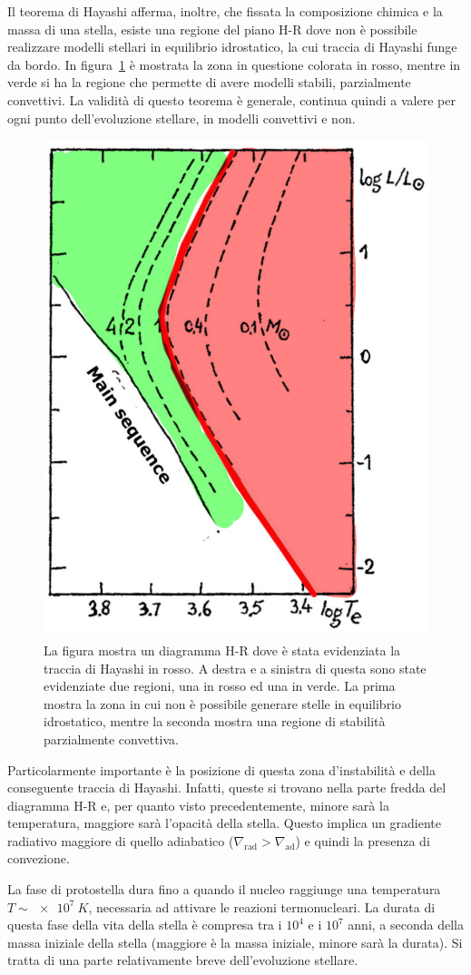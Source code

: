 Il teorema di Hayashi afferma, inoltre, che fissata la composizione chimica e la massa di una stella, esiste una regione del piano H-R dove non è possibile realizzare modelli stellari in equilibrio idrostatico, la cui traccia di Hayashi funge da bordo. In figura~\ref{fig:hay} è mostrata la zona in questione colorata in rosso, mentre in verde si ha la regione che permette di avere modelli stabili, parzialmente convettivi. La validità di questo teorema è generale,  continua quindi a valere per ogni punto dell'evoluzione stellare, in modelli convettivi e non.

\begin{figure}
    \centering
    \includegraphics[width = 0.3 \textwidth]{immagini/hayashi-1.png}
    \caption{La figura mostra un diagramma H-R dove è stata evidenziata la traccia di Hayashi in rosso. A destra e a sinistra di questa sono state evidenziate due regioni, una in rosso ed una in verde. La prima mostra la zona in cui non è possibile generare stelle in equilibrio idrostatico, mentre la seconda mostra una regione di stabilità parzialmente convettiva.}\label{fig:hay}
\end{figure}

Particolarmente importante è la posizione di questa zona d'instabilità e della conseguente traccia di Hayashi. Infatti, queste si trovano nella parte fredda del diagramma H-R e, per quanto visto precedentemente, minore sarà la temperatura, maggiore sarà l'opacità della stella. Questo implica un gradiente radiativo maggiore di quello adiabatico ($\nabla_{\mbox{rad}} > \nabla_{\mbox{ad}}$) e quindi la presenza di convezione.

La fase di protostella dura fino a quando il nucleo raggiunge una temperatura $T \sim \SI{e7}{K}$, necessaria ad attivare le reazioni termonucleari. La durata di questa fase della vita della stella è compresa tra i $10^4$ e i $10^7$ anni, a seconda della massa iniziale della stella (maggiore è la massa iniziale, minore sarà la durata). Si tratta di una parte relativamente breve dell'evoluzione stellare.